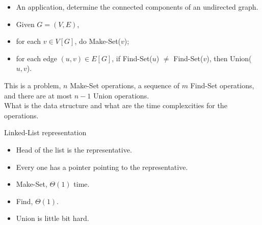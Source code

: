\documentclass{beamer}
\begin{document}

\begin{frame}{}

\begin{itemize}
\item An application, determine the connected components of an 
 undirected graph.
\item Given $G=(V,E)$, 
\item for each $v\in V[G]$, do Make-Set($v$);
\item for each edge $(u,v)\in E[G]$, if Find-Set($u$) $\ne$ Find-Set($v$),
 then Union($u,v$).
\end{itemize}
\vspace{1cm}
This is a problem, $n$ Make-Set operations, a sequence of $m$ Find-Set operations, 
 and there are at most $n-1$ Union operations.  \\
What is the data structure and what are the time complexcities for the
 operations.  
\end{frame}

\begin{frame}{}

\centerline{\large Linked-List representation}
\begin{itemize}
\item Head of the list is the representative.  
\item Every one has a pointer pointing to the representative. 
\item Make-Set, $\Theta(1)$ time. 
\item Find, $\Theta(1)$.
\item Union is little bit hard.  
\end{itemize}
\end{frame}
\end{document}
